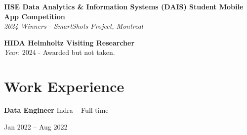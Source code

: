 \documentclass[10pt, letterpaper]{article}
\newenvironment{highlights}{
    \begin{itemize}[
        topsep=0.10 cm,
        parsep=0.10 cm,
        partopsep=0pt,
        itemsep=0pt,
        leftmargin=0 cm + 10pt
    ]
}{
    \end{itemize}
} %
\newenvironment{twocolentry}[2][]{
    \onecolentry
    \def\secondColumn{#2}
    \setcolumnwidth{\fill, 4.5 cm}
    \begin{paracol}{2}
}{
    \switchcolumn \raggedleft \secondColumn
    \end{paracol}
    \endonecolentry
} %
\begin{document}
        \noindent \textbf{IISE Data Analytics \& Information Systems (DAIS) Student Mobile App Competition} \\
        \textit{2024 Winners - SmartShots Project, Montreal} \\
        
        
        \vspace{0.3em} %
        
        
        \vspace{0.3em} %
        
        \noindent \textbf{HIDA Helmholtz Visiting Researcher} \\
        \textit{Year}: 2024 - Awarded but not taken.

        
\section*{\small Work Experience}

\begin{twocolentry}{Jan 2022 – Aug 2022}
    \textbf{Data Engineer} \textbar Indra – Full-time
\end{twocolentry}
\end{document}
